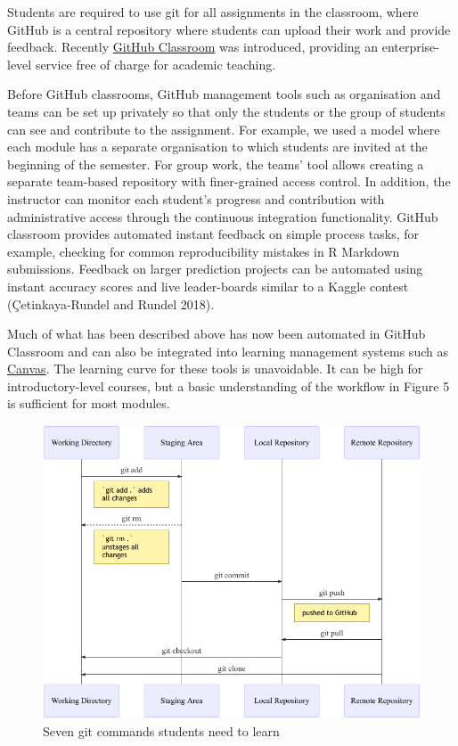 \documentclass{article}
\begin{document}
Students are required to use git for all assignments in the classroom,
where GitHub is a central repository where students can upload their
work and provide feedback. Recently
\href{https://classroom.github.com/}{GitHub Classroom} was introduced,
providing an enterprise-level service free of charge for academic
teaching.

Before GitHub classrooms, GitHub management tools such as organisation
and teams can be set up privately so that only the students or the group
of students can see and contribute to the assignment. For example, we
used a model where each module has a separate organisation to which
students are invited at the beginning of the semester. For group work,
the teams' tool allows creating a separate team-based repository with
finer-grained access control. In addition, the instructor can monitor
each student's progress and contribution with administrative access
through the continuous integration functionality. GitHub classroom
provides automated instant feedback on simple process tasks, for
example, checking for common reproducibility mistakes in R Markdown
submissions. Feedback on larger prediction projects can be automated
using instant accuracy scores and live leader-boards similar to a Kaggle
contest (Çetinkaya-Rundel and Rundel 2018).

Much of what has been described above has now been automated in GitHub
Classroom and can also be integrated into learning management systems
such as
\href{https://docs.github.com/en/education/manage-coursework-with-github-classroom/teach-with-github-classroom/connect-a-learning-management-system-to-github-classroom}{Canvas}.
The learning curve for these tools is unavoidable. It can be high for
introductory-level courses, but a basic understanding of the workflow in
Figure 5 is sufficient for most modules.

\begin{figure}

{\centering \includegraphics{qrap_files/figure-latex/github-workflow-1} 

}

\caption{Seven git commands students need to learn}\label{fig:github-workflow}
\end{figure}
\end{document}
